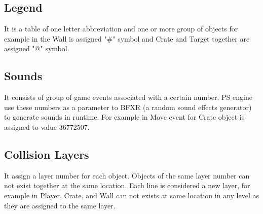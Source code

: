 \subsection{Legend}
It is a table of one letter abbreviation and one or more group of objects for example in  the Wall is assigned "\#" symbol and Crate and Target together are assigned "@" symbol.

\subsection{Sounds}
It consists of group of game events associated with a certain number. PS engine use these numbers as a parameter to BFXR (a random sound effects generator) to generate sounds in runtime\cite{bfxr}. For example in  Move event for Crate object is assigned to value 36772507.

\subsection{Collision Layers}
It assign a layer number for each object. Objects of the same layer number can not exist together at the same location. Each line is considered a new layer, for example in  Player, Crate, and Wall can not exists at same location in any level as they are assigned to the same layer.

